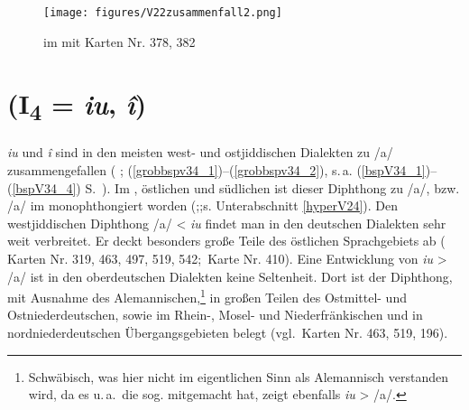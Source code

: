  
  \begin{figure}
		\centering
\texttt{[image: figures/V22zusammenfall2.png]}
		\caption{\label{karteV22}   im  mit  Karten Nr. 378, 382}
		\end{figure}

 



 
 
 \section{ (I\textsubscript{4} = {\mhd} \textit{iu}, \textit{î})}\label{phonV35}

{\MHD} \textit{iu} und \textit{î} sind in den meisten west- und ostjiddischen Dialekten zu /a\textsubarch{\textsci}/ zusammengefallen ( \citealt[77]{Herzog1992};\citealt[206]{Timm1987} (\ref{grobbspv34_1})--(\ref{grobbspv34_2}), s.\,a. (\ref{bspV34_1})–(\ref{bspV34_4}) S.\, \pageref{bspV34_1}). Im \hai{{\ZOJ}}, östlichen  und südlichen \hai{{\SOJ}} ist dieser Diphthong zu /a\textlengthmark/, bzw. /a/ im \hai{{\SOJ}} monophthongiert worden (\citealt[77]{Herzog1992};\citealt[206]{Timm1987};s. Unterabschnitt \ref{hyperV24}). Den westjiddischen Diphthong /a\textsubarch{\textsci}/ < {\mhd} \textit{iu} findet man in den deutschen Dialekten sehr weit verbreitet. Er deckt besonders große Teile des östlichen Sprachgebiets ab ( Karten Nr. 319, 463, 497, 519, 542;\,  Karte Nr. 410). Eine Entwicklung von {\mhd}  \textit{iu} > /a\textsubarch{\textsci}/ ist in den oberdeutschen Dialekten keine Seltenheit. Dort ist der Diphthong, mit Ausnahme des Alemannischen,\footnote{Schwäbisch, was hier nicht im eigentlichen Sinn als Alemannisch verstanden wird, da es u.\,a.\, die sog.  mitgemacht hat, zeigt ebenfalls {\mhd}  \textit{iu} > /a\textsubarch{\textsci}/.} in großen Teilen des Ostmittel- und Ostniederdeutschen, sowie im Rhein-, Mosel- und Niederfränkischen und in nordniederdeutschen Übergangsgebieten belegt (vgl.\, Karten Nr. 463, 519, 196).






